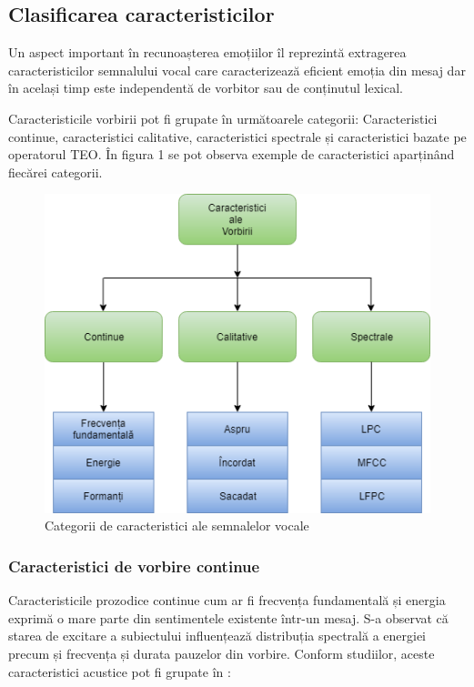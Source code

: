 \documentclass[9pt,shortpaper,twoside,web]{ieeecolor}
\begin{document}
\subsection{Clasificarea caracteristicilor}
Un aspect important în recunoașterea emoțiilor îl reprezintă extragerea caracteristicilor semnalului vocal care caracterizează eficient emoția din mesaj dar în același timp este independentă de vorbitor sau de conținutul lexical.

Caracteristicile vorbirii pot fi grupate în următoarele categorii: Caracteristici continue, caracteristici calitative, caracteristici spectrale și caracteristici bazate pe operatorul TEO. În figura 1 se pot observa exemple de caracteristici aparținând fiecărei categorii.

\begin{figure}[htb]
\includegraphics[width=0.9\columnwidth]{res/fig/clasificare_caracteristicilor}
\caption{Categorii de caracteristici ale semnalelor vocale}
\label{fig1}
\end{figure}

\subsubsection{Caracteristici de vorbire continue}
Caracteristicile prozodice continue cum ar fi frecvența fundamentală și energia exprimă o mare parte din sentimentele existente într-un mesaj. S-a observat că starea de excitare a subiectului influențează distribuția spectrală a energiei precum și frecvența și durata pauzelor din vorbire. Conform studiilor, aceste caracteristici acustice pot fi grupate în \cite{b1}:
\end{document}
